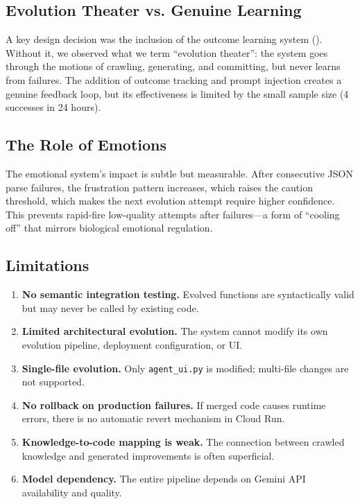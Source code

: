\documentclass[11pt,a4paper]{article}
\begin{document}
\subsection{Evolution Theater vs. Genuine Learning}

A key design decision was the inclusion of the outcome learning system (). Without it, we observed what we term ``evolution theater'': the system goes through the motions of crawling, generating, and committing, but never learns from failures. The addition of outcome tracking and prompt injection creates a genuine feedback loop, but its effectiveness is limited by the small sample size (4 successes in 24 hours).

\subsection{The Role of Emotions}

The emotional system's impact is subtle but measurable. After consecutive JSON parse failures, the frustration pattern increases, which raises the caution threshold, which makes the next evolution attempt require higher confidence. This prevents rapid-fire low-quality attempts after failures---a form of ``cooling off'' that mirrors biological emotional regulation.

\subsection{Limitations}

\begin{enumerate}[noitemsep]
    \item \textbf{No semantic integration testing.} Evolved functions are syntactically valid but may never be called by existing code.
    \item \textbf{Limited architectural evolution.} The system cannot modify its own evolution pipeline, deployment configuration, or UI.
    \item \textbf{Single-file evolution.} Only \texttt{agent\_ui.py} is modified; multi-file changes are not supported.
    \item \textbf{No rollback on production failures.} If merged code causes runtime errors, there is no automatic revert mechanism in Cloud Run.
    \item \textbf{Knowledge-to-code mapping is weak.} The connection between crawled knowledge and generated improvements is often superficial.
    \item \textbf{Model dependency.} The entire pipeline depends on Gemini API availability and quality.
\end{enumerate}
\end{document}
